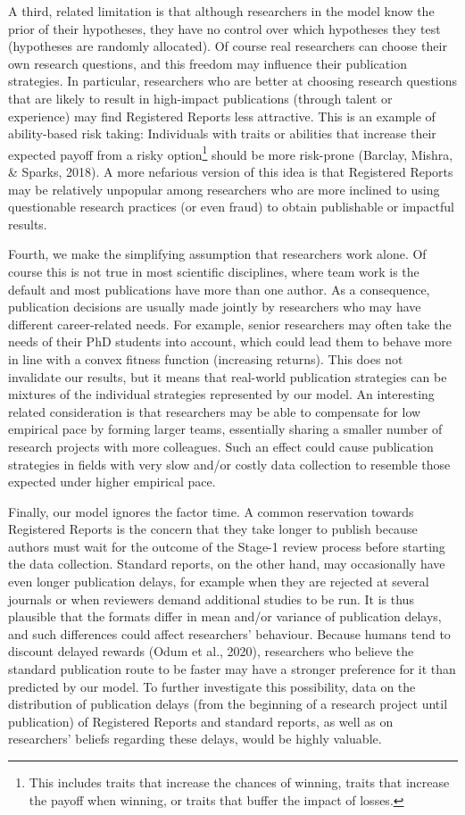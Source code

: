 \documentclass[
  ,man,mask,floatsintext]{apa6}
\begin{document}
A third, related limitation is that although researchers in the model know the prior of their hypotheses, they have no control over
which hypotheses they test (hypotheses are randomly allocated).
Of course real researchers can choose their own research questions, and this freedom may influence their publication strategies.
In particular, researchers who are better at choosing research questions that are likely to result in high-impact publications (through talent or experience) may find Registered Reports less attractive.
This is an example of ability-based risk taking:
Individuals with traits or abilities that increase their expected payoff from a risky option\footnote{This includes traits that increase the chances of winning, traits that increase the payoff when winning, or traits that buffer the impact of losses.} should be more risk-prone (Barclay, Mishra, \& Sparks, 2018).
A more nefarious version of this idea is that Registered Reports may be relatively unpopular among researchers who are more inclined to using questionable research practices (or even fraud) to obtain publishable or impactful results.

Fourth, we make the simplifying assumption that researchers work alone.
Of course this is not true in most scientific disciplines, where team work is the default and most publications have more than one author.
As a consequence, publication decisions are usually made jointly by researchers who may have different career-related needs.
For example, senior researchers may often take the needs of their PhD students into account, which could lead them to behave more in line with a convex fitness function (increasing returns).
This does not invalidate our results, but it means that
real-world publication strategies can be mixtures of the individual strategies represented by our model.
An interesting related consideration is that researchers may be able to compensate for low empirical pace by forming larger teams, essentially sharing a smaller number of research projects with more colleagues.
Such an effect could cause publication strategies in fields with very slow and/or costly data collection to resemble those expected under higher empirical pace.

Finally, our model ignores the factor time.
A common reservation towards Registered Reports is the concern that they take longer to publish because authors must wait for the outcome of the Stage-1 review process before starting the data collection.
Standard reports, on the other hand, may occasionally have even longer publication delays, for example when they are rejected at several journals or when reviewers demand additional studies to be run.
It is thus plausible that the formats differ in mean and/or variance of publication delays, and such differences could affect researchers' behaviour.
Because humans tend to discount delayed rewards (Odum et al., 2020), researchers who believe the standard publication route to be faster may have a stronger preference for it than predicted by our model.
To further investigate this possibility, data on the distribution of publication delays (from the beginning of a research project until publication) of Registered Reports and standard reports, as well as on researchers' beliefs regarding these delays, would be highly valuable.
\end{document}
